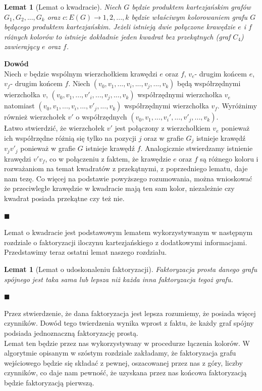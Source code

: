 \documentclass[12pt,a4paper,titlepage]{article}
\newtheorem{lem}[twr]{Lemat}
\newcommand\tab[1][1cm]{\hspace*{#1}}
\begin{document}
\begin{lem}[Lemat o kwadracie]
Niech $G$ będzie produktem kartezjańskim grafów $G_1, G_2, ... , G_k$ oraz $c: E(G) \rightarrow {1,2,...,k}$ będzie właściwym kolorowaniem grafu $G$ będącego produktem kartezjańskim. Jeżeli istnieją dwie połączone krawędzie $e$ i $f$ różnych kolorów to istnieje dokładnie jeden kwadrat bez przekątnych (graf $C_4$) zawierający $e$ oraz $f$.
\end{lem}
\textbf{Dowód}\\
\tab[0.6cm]Niech $v$ będzie wspólnym wierzchołkiem krawędzi $e$ oraz $f$, $v_e$- drugim końcem $e$, $v_f$- drugim końcem $f$. Niech $(v_0 , v_1, ... ,v_i, ..., v_j,...,v_k )$ będą współrzędnymi wierzchołka $v$, $(v_0 , v_1, ... ,v'_i, ..., v_j,...,v_k )$ współrzędnymi wierzchołka $v_e$ natomiast $(v_0 , v_1, ... ,v_i, ..., v'_j,...,v_k )$ współrzędnymi wierzchołka $v_f$. Wyróżnimy również wierzchołek $v'$ o współrzędnych $(v_0 , v_1, ...,v_i', ..., v'_j,...,v_k )$.\\
\tab[0.6cm]Łatwo stwierdzić, że wierzchołek $v'$ jest połączony z wierzchołkiem $v_e$ ponieważ ich współrzędne różnią się tylko na pozycji $j$ oraz w grafie $G_j$ istnieje krawędź $v_j v'_j$ ponieważ w grafie $G$ istnieje krawędź $f$. Analogicznie stwierdzamy istnienie krawędzi $v'v_f$, co w połączeniu z faktem, że krawędzie $e$ oraz $f$ są różnego koloru i rozważaniom na temat kwadratów z przekątnymi, z poprzedniego lematu, daje nam tezę. Co więcej na podstawie powyższego rozumowania, można wnioskować że przeciwległe krawędzie w kwadracie mają ten sam kolor, niezależnie czy kwadrat posiada przekątne czy też nie.
\begin{flushright}
$\blacksquare$
\end{flushright}
\tab[0.6cm]Lemat o kwadracie jest podstawowym lematem wykorzystywanym w następnym rozdziale o faktoryzacji iloczynu kartezjańskiego z dodatkowymi informacjami. \\
\tab[0.6cm]Przedstawimy teraz ostatni lemat naszego rozdziału.\\
\begin{lem}[Lemat o udoskonaleniu faktoryzacji] 
Faktoryzacja prosta danego grafu spójnego jest taka sama lub lepsza niż każda inna faktoryzacja tegoż grafu.
\end{lem}
\begin{flushright}
$\blacksquare$
\end{flushright}
\tab[0.6cm]Przez stwierdzenie, że dana faktoryzacja jest lepsza rozumiemy, że posiada więcej czynników. Dowód tego twierdzenia wynika wprost z faktu, że każdy graf spójny podsiada jednoznaczną faktoryzację prostą. \\
\tab[0.6cm]Lemat ten będzie przez nas wykorzystywany w procedurze łączenia kolorów. W algorytmie opisanym w szóstym rozdziale zakładamy, że faktoryzacja grafu wejściowego będzie się składać z pewnej, oszacowanej przez nas z góry, liczby czynników, co daje nam pewność, że uzyskana przez nas końcowa faktoryzacją będzie faktoryzacją pierwszą.
\newpage
\end{document}
